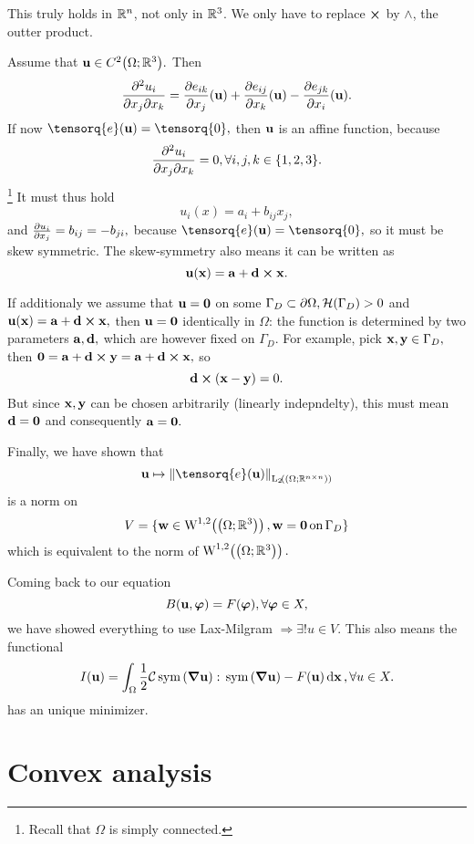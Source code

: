 \documentclass[11pt]{scrartcl} %
\begin{document}
\begin{remark}[$\R^n$]
    This truly holds in $\R^n$, not only in ${\mathbb R}^3$. We only have to replace $\cross$ by $\wedge$, the outter product.
\end{remark}

Assume that $\vb{u} \in C^2\qty(\Omega ; {\mathbb R}^3).$ Then
\[
	\pdv[2]{u_i}{x_j}{x_k} = \pdv{e_{ik}}{x_j}\qty(\vb{u}) + \pdv{e_{ij}}{x_k}\qty(\vb{u}) - \pdv{e_{jk}}{x_i}\qty(\vb{u}).
\]
If now $\tensorq{e}\qty(\vb{u}) = \tensorq{0}, $ then $\vb{u}$ is an affine function, because
\[
	\pdv[2]{u_i}{x_j}{x_k} = 0, \forall i,j,k \in \{1, 2, 3\}.
\]
\footnote{Recall that $\Omega$ is simply connected.} It must thus hold
\[
	u_i(x) = a_i + b_{ij}x_j,
\]
and $\pdv{u_i}{x_j} = b_{ij} = - b_{ji},$ because $\tensorq{e}\qty(\vb{u}) = \tensorq{0},$ so it must be skew symmetric. The skew-symmetry also means it can be written as
\[
	\vb{u}\qty(\vb{x}) = \vb{a} + \vb{d} \cross \vb{x}.
\]

If additionaly we assume that $\vb{u} = \vb{0}$ on some $\Gamma_D \subset \partial \Omega, \mathcal{H}\qty(\Gamma_{D})>0$ and $\vb{u}\qty(\vb{x}) = \vb{a}+ \vb{d} \cross \vb{x},$ then $\vb{u} = \vb{0}$ identically in $\Omega$: the function is determined by two parameters $\vb{a}, \vb{d},$ which are however fixed on $\Gamma_D$. For example, pick $\vb{x}, \vb{y} \in \Gamma_D,$ then $\vb{0} = \vb{a} + \vb{d} \cross \vb{y} = \vb{a} + \vb{d} \cross \vb{x}, $ so
\[
	\vb{d} \cross \qty(\vb{x} - \vb{y}) = 0.
\]
But since $\vb{x}, \vb{y}$ can be chosen arbitrarily (linearly indepndelty), this must mean $\vb{d} = \vb{0}$ and consequently $\vb{a} = \vb{0}.$

Finally, we have shown that
\[
	\vb{u} \mapsto \norm{\tensorq{e}\qty(\vb{u})}_{\LpSet[2]{\qty(\Omega; \R^{n \times n})}}
\]
is a norm on
\[
	V = \{ \vb{w} \in \WkpSet[1][2]{\qty(\Omega; \R^3)}, \vb{w} = \vb{0} \, \text{on} \, \Gamma_D \}
\]
which is equivalent to the norm of $\WkpSet[1][2]{\qty(\Omega; \R^3)}.$

Coming back to our equation
\[
	B\qty(\vb{u},\vb*{\varphi}) = F(\vb*{\varphi}), \forall \vb*{\varphi} \in X,
\]
we have showed everything to use Lax-Milgram $\Rightarrow \exists ! u \in V.$ This also means the functional
\[
	I(\vb{u}) =  \int_{\Omega}\frac{1}{2}\mathcal{C}\, \text{sym} \,\qty(\grad\vb{u}) :\, \text{sym} \,\qty(\grad \vb{u})-F\qty(\vb{u})\dd{\vb{x}}, \forall u \in X.
\]
has an unique minimizer.

\section{Convex analysis}
\label{sec:convex_analysis}
\end{document}
